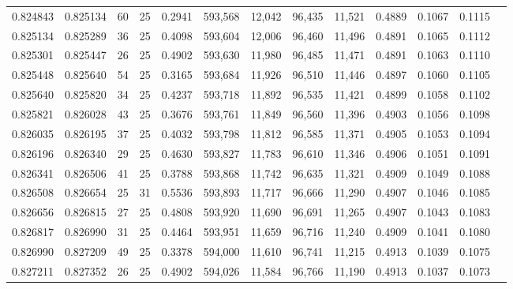 \begin{tabular}{rrrrrrrrrrrrr}
0.824843 & 0.825134 &    60 &  25 &                                     0.2941 & 593,568 &  12,042 &  96,435 &  11,521 & 0.4889 & 0.1067 & 0.1115 \\
0.825134 & 0.825289 &    36 &  25 &                                     0.4098 & 593,604 &  12,006 &  96,460 &  11,496 & 0.4891 & 0.1065 & 0.1112 \\
0.825301 & 0.825447 &    26 &  25 &                                     0.4902 & 593,630 &  11,980 &  96,485 &  11,471 & 0.4891 & 0.1063 & 0.1110 \\
0.825448 & 0.825640 &    54 &  25 &                                     0.3165 & 593,684 &  11,926 &  96,510 &  11,446 & 0.4897 & 0.1060 & 0.1105 \\
0.825640 & 0.825820 &    34 &  25 &                                     0.4237 & 593,718 &  11,892 &  96,535 &  11,421 & 0.4899 & 0.1058 & 0.1102 \\
0.825821 & 0.826028 &    43 &  25 &                                     0.3676 & 593,761 &  11,849 &  96,560 &  11,396 & 0.4903 & 0.1056 & 0.1098 \\
0.826035 & 0.826195 &    37 &  25 &                                     0.4032 & 593,798 &  11,812 &  96,585 &  11,371 & 0.4905 & 0.1053 & 0.1094 \\
0.826196 & 0.826340 &    29 &  25 &                                     0.4630 & 593,827 &  11,783 &  96,610 &  11,346 & 0.4906 & 0.1051 & 0.1091 \\
0.826341 & 0.826506 &    41 &  25 &                                     0.3788 & 593,868 &  11,742 &  96,635 &  11,321 & 0.4909 & 0.1049 & 0.1088 \\
0.826508 & 0.826654 &    25 &  31 &                                     0.5536 & 593,893 &  11,717 &  96,666 &  11,290 & 0.4907 & 0.1046 & 0.1085 \\
0.826656 & 0.826815 &    27 &  25 &                                     0.4808 & 593,920 &  11,690 &  96,691 &  11,265 & 0.4907 & 0.1043 & 0.1083 \\
0.826817 & 0.826990 &    31 &  25 &                                     0.4464 & 593,951 &  11,659 &  96,716 &  11,240 & 0.4909 & 0.1041 & 0.1080 \\
0.826990 & 0.827209 &    49 &  25 &                                     0.3378 & 594,000 &  11,610 &  96,741 &  11,215 & 0.4913 & 0.1039 & 0.1075 \\
0.827211 & 0.827352 &    26 &  25 &                                     0.4902 & 594,026 &  11,584 &  96,766 &  11,190 & 0.4913 & 0.1037 & 0.1073 \\

\end{tabular}
